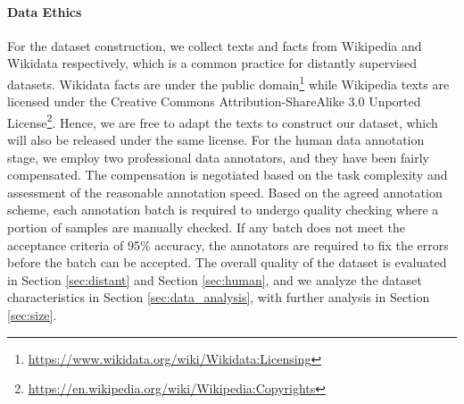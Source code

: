 \documentclass[11pt]{article}
\newcommand{\dataname}{HyperRED}
\begin{document}
\paragraph{Data Ethics} 
For the dataset construction, we collect texts and facts from Wikipedia and Wikidata respectively, which is a common practice for distantly supervised datasets.
Wikidata facts are under the public domain\footnote{\href{https://www.wikidata.org/wiki/Wikidata:Licensing}{https://www.wikidata.org/wiki/Wikidata:Licensing}} while Wikipedia texts are licensed under the Creative Commons Attribution-ShareAlike 3.0 Unported License\footnote{\href{https://en.wikipedia.org/wiki/Wikipedia:Copyrights}{https://en.wikipedia.org/wiki/Wikipedia:Copyrights}}. 
Hence, we are free to adapt the texts to construct our dataset, which will also be released under the same license.
For the human data annotation stage, we employ two professional data annotators, and they have been fairly compensated.
The compensation is negotiated based on the task complexity and assessment of the reasonable annotation speed.
Based on the agreed annotation scheme, each annotation batch is required to undergo quality checking where a portion of samples are manually checked.
If any batch does not meet the acceptance criteria of 95\% accuracy, the annotators are required to fix the errors before the batch can be accepted.
The overall quality of the dataset is evaluated in Section \ref{sec:distant} and Section \ref{sec:human}, and we analyze the dataset characteristics in Section \ref{sec:data_analysis}, with further analysis in Section \ref{sec:size}.





\clearpage
\newpage




\begin{table*}[t]
    \centering
  \caption{Detailed statistics for the \dataname{} dataset.} 
    \label{tab:data_details}
\end{table*}
\end{document}
